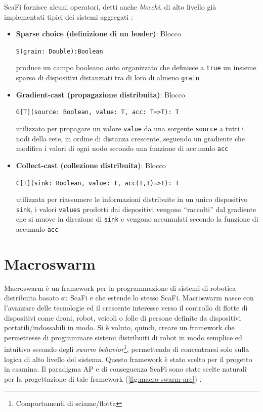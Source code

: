 \documentclass[12pt,a4paper,openright,twoside]{book}
\begin{document}
ScaFi fornisce alcuni operatori, detti anche \textit{blocchi}, di alto livello già implementati tipici dei sistemi aggregati \cite{Casadei2022}:

\begin{itemize}
    \item \textbf{Sparse choice (definizione di un leader)}: Blocco 
    \begin{center}
        \verb|S(grain: Double):Boolean|
    \end{center}
    produce un campo booleano auto organizzato che definisce a \verb|true| un insieme sparso di dispositivi distanziati tra di loro di almeno \verb|grain|
    \item \textbf{Gradient-cast (propagazione distribuita)}: Blocco 
    \begin{center}
        \verb|G[T](source: Boolean, value: T, acc: T=>T): T|
    \end{center}
    utilizzato per propagare un valore \verb|value| da una sorgente \verb|source| a tutti i nodi della rete, in ordine di distanza crescente, seguendo un gradiente che modifica i valori di ogni nodo secondo una funzione di accumulo \verb|acc|
    \item \textbf{Collect-cast (collezione distribuita)}: Blocco 
    \begin{center}
        \verb|C[T](sink: Boolean, value: T, acc(T,T)=>T): T| 
    \end{center}
    utilizzata per riassumere le informazioni distribuite in un unico dispositivo \verb|sink|, i valori \verb|values| prodotti dai dispositivi vengono ``raccolti'' dal gradiente che si muove in direzione di \verb|sink| e vengono accumulati secondo la funzione di accumulo \verb|acc|
\end{itemize}

\section{Macroswarm}

Macroswarm è un framework per la programmazione di sistemi di robotica distribuita basato su ScaFi e che estende lo stesso ScaFi. Macroswarm nasce con l'avanzare delle tecnologie ed il crescente interesse verso il controllo di flotte di dispositivi come droni, robot, veicoli o folle di persone definite da dispositivi portatili/indossabili in modo.
Si è voluto, quindi, creare un framework che permettesse di programmare sistemi distribuiti di robot in modo semplice ed intuitivo secondo degli \textit{swarm behavior}\footnote{Comportamenti di sciame/flotta}, permettendo di concentrarsi solo sulla logica di alto livello del sistema. Questo framework è stato scelto per il progetto in esamina.
Il paradigma \ac{AP} e di conseguenza ScaFi sono state scelte naturali per la progettazione di tale framework (\cref{fig:macro-swarm-arc}) \cite{Macroswarm}.
\end{document}
